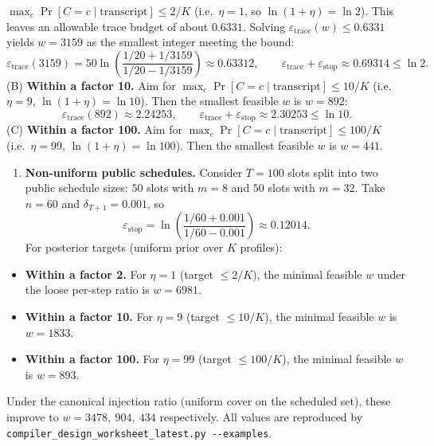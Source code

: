 \documentclass[11pt]{article}
\providecommand{\tightlist}{%
  \setlength{\itemsep}{0pt}\setlength{\parskip}{0pt}}
\begin{document}
\(\max_c \Pr[C=c\mid \text{transcript}]\le 2/K\) (i.e.~\(\eta=1\), so
\(\ln(1+\eta)=\ln 2\)). This leaves an allowable trace budget of about
\(0.6331\). Solving \(\varepsilon_{\mathrm{trace}}(w)\le 0.6331\) yields
\(w=3159\) as the smallest integer meeting the bound: \[
\varepsilon_{\mathrm{trace}}(3159)=50\ln\left(\frac{1/20+1/3159}{1/20-1/3159}\right)\approx 0.63312,
\qquad\varepsilon_{\mathrm{trace}}+\varepsilon_{\mathrm{stop}}\approx 0.69314\le\ln 2.
\] (B) \textbf{Within a factor 10.} Aim for
\(\max_c \Pr[C=c\mid \text{transcript}]\le 10/K\) (i.e.~\(\eta=9\),
\(\ln(1+\eta)=\ln 10\)). Then the smallest feasible \(w\) is \(w=892\):
\[
\varepsilon_{\mathrm{trace}}(892)\approx 2.24253,
\qquad\varepsilon_{\mathrm{trace}}+\varepsilon_{\mathrm{stop}}\approx 2.30253\le\ln 10.
\] (C) \textbf{Within a factor 100.} Aim for
\(\max_c \Pr[C=c\mid \text{transcript}]\le 100/K\) (i.e.~\(\eta=99\),
\(\ln(1+\eta)=\ln 100\)). Then the smallest feasible \(w\) is \(w=441\).

\begin{enumerate}
\def\labelenumi{(\Alph{enumi})}
\setcounter{enumi}{3}
\tightlist
\item
  \textbf{Non-uniform public schedules.} Consider \(T=100\) slots split
  into two public schedule sizes: \(50\) slots with \(m=8\) and \(50\)
  slots with \(m=32\). Take \(n=60\) and \(\delta_{T+1}=0.001\), so \[
  \varepsilon_{\mathrm{stop}} = \ln\left(\frac{1/60+0.001}{1/60-0.001}\right) \approx 0.12014.
  \] For posterior targets (uniform prior over \(K\) profiles):
\end{enumerate}

\begin{itemize}
\tightlist
\item
  \textbf{Within a factor 2.} For \(\eta=1\) (target \(\le 2/K\)), the
  minimal feasible \(w\) under the loose per-step ratio is \(w=6981\).
\item
  \textbf{Within a factor 10.} For \(\eta=9\) (target \(\le 10/K\)), the
  minimal feasible \(w\) is \(w=1833\).
\item
  \textbf{Within a factor 100.} For \(\eta=99\) (target \(\le 100/K\)),
  the minimal feasible \(w\) is \(w=893\).
\end{itemize}

Under the canonical injection ratio (uniform cover on the scheduled
set), these improve to \(w=3478,\ 904,\ 434\) respectively. All values
are reproduced by
\texttt{compiler\_design\_worksheet\_latest.py\ -\/-examples}.
\end{document}
